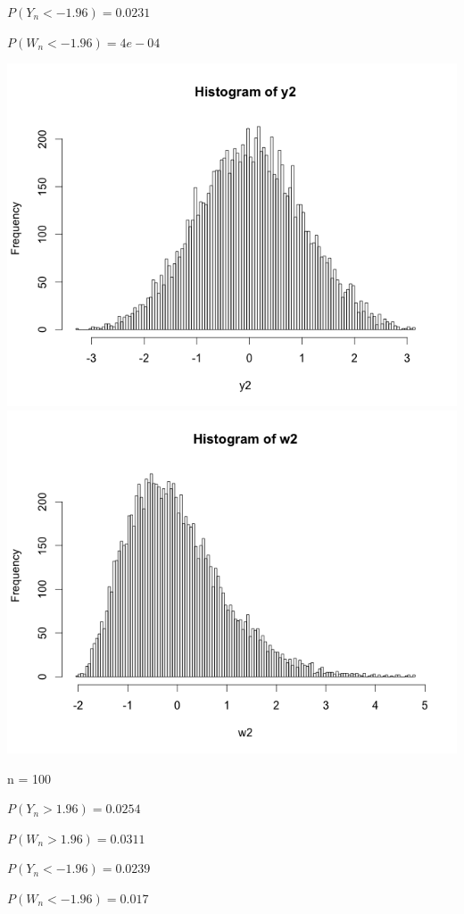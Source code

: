 \documentclass[12pt]{article}
\begin{document}
\begin{list}{()~}{}
$P(Y_n < -1.96) = 0.0231$

$P(W_n < -1.96) = 4e-04$ 

\includegraphics[width=1\textwidth]{Rplot02.png}
\includegraphics[width=1\textwidth]{Rplot06.png}

n = 100

$P(Y_n > 1.96) = 0.0254$

$P(W_n > 1.96) = 0.0311$

$P(Y_n < -1.96) = 0.0239$

$P(W_n < -1.96) = 0.017$ 


\end{list}
\end{document}

